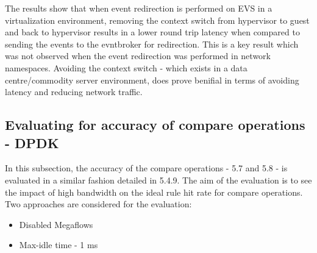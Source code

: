 The results show that when event redirection is performed on EVS in a virtualization environment, removing the context switch from hypervisor to guest and back to hypervisor results in a lower round trip latency when compared to sending the events to the evntbroker for redirection. This is a key result which was not observed when the event redirection was performed in network namespaces. Avoiding the context switch - which exists in a data centre/commodity server environment, does prove benifial in terms of avoiding latency and reducing network traffic. 



\subsection{Evaluating for accuracy of compare operations - DPDK}
In this subsection, the accuracy of the compare operations - 5.7 and 5.8 - is evaluated in a similar fashion detailed in 5.4.9. The aim of the evaluation is to see the impact of high bandwidth on the ideal rule hit rate for compare operations. Two approaches are considered for the evaluation: 
\begin{itemize}
 \item Disabled Megaflows
 \item Max-idle time - 1 ms
\end{itemize} 


\delaydata



